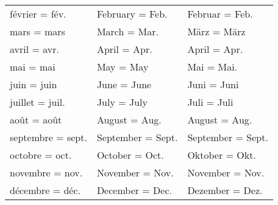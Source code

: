 \begin{table}[!ht]
\begin{center}
\begin{tabular}{lll}
       février = fév.     & February = Feb.    & Februar = Feb.\\
       mars = mars        & March = Mar.       & März = März\\
       avril = avr.       & April = Apr.       & April = Apr.\\
       mai = mai          & May = May          & Mai = Mai.\\
       juin = juin        & June = June        & Juni = Juni\\
       juillet = juil.    & July = July        & Juli = Juli\\
       août = août        & August = Aug.      & August = Aug.\\
       septembre = sept.  & September = Sept.  & September = Sept.\\
       octobre = oct.     & October = Oct.     & Oktober = Okt.\\
       novembre = nov.    & November = Nov.    & November = Nov.\\
       décembre = déc.    & December = Dec.    & Dezember = Dez. \\ 
    \hline
   \end{tabular}
   \end{center}
\end{table}

